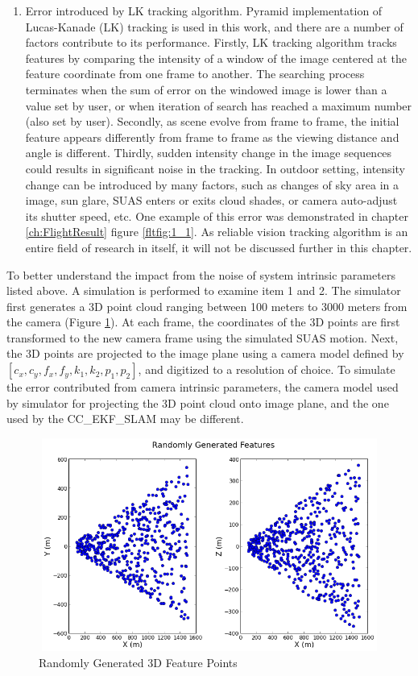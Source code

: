 \begin{enumerate}
  \item Error introduced by LK tracking algorithm. Pyramid implementation of Lucas-Kanade (LK) tracking is used in this work, and there are a number of factors contribute to its performance. Firstly, LK tracking algorithm tracks features by comparing the intensity of a window of the image centered at the feature coordinate from one frame to another. The searching process terminates when the sum of error on the windowed image is lower than a value set by user, or when iteration of search has reached a maximum number (also set by user). Secondly, as scene evolve from frame to frame, the initial feature appears differently from frame to frame as the viewing distance and angle is different. Thirdly, sudden intensity change in the image sequences could results in significant noise in the tracking. In outdoor setting, intensity change can be introduced by many factors, such as changes of sky area in a image, sun glare, SUAS enters or exits cloud shades, or camera auto-adjust its shutter speed, etc. One example of this error was demonstrated in chapter \ref{ch:FlightResult} figure \ref{fltfig:1_1}. As reliable vision tracking algorithm is an entire field of research in itself, it will not be discussed further in this chapter.

\end{enumerate}

To better understand the impact from the noise of system intrinsic parameters listed above. A simulation is performed to examine item 1 and 2. The simulator first generates a 3D point cloud ranging between 100 meters to 3000 meters from the camera (Figure \ref{fig:simfig51}). At each frame, the coordinates of the 3D points are first transformed to the new camera frame using the simulated SUAS motion. Next, the 3D points are projected to the image plane using a camera model defined by $[c_{x}, c_{y}, f_{x}, f_{y}, k_{1}, k_{2}, p_{1}, p_{2}]$, and digitized to a resolution of choice. To simulate the error contributed from camera intrinsic parameters, the camera model used by simulator for projecting the 3D point cloud onto image plane, and the one used by the CC\_EKF\_SLAM may be different.

\begin{figure}[h]
\centering
\includegraphics[width=12cm, height=7cm]{./Figures/SimulationFigures/Figure51.png}
\caption{Randomly Generated 3D Feature Points}
\label{fig:simfig51}
\end{figure}
\FloatBarrier

